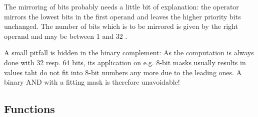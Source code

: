 \documentclass[12pt,twoside]{report}
\begin{document}
The mirroring of bits probably needs a little bit of explanation: the
operator mirrors the lowest bits in the first operand and leaves the
higher priority bits unchanged.  The number of bits which is to be
mirrored is given by the right operand and may be between 1 and 32 .

A small pitfall is hidden in the binary complement: As the
computation is always done with 32 resp. 64 bits, its application on
e.g. 8-bit masks usually results in values taht do not fit into 8-bit
numbers any more due to the leading ones.  A binary AND with a
fitting mask is therefore unavoidable!

\subsection{Functions}
\end{document}
